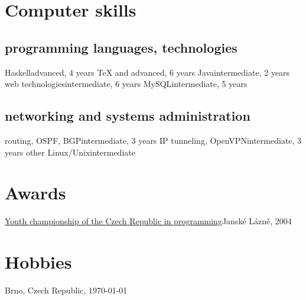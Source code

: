 \documentclass[11pt,a4paper]{moderncv}
\begin{document}
\section{Computer skills}
\subsection{programming languages, technologies}
    {Haskell}{advanced, 4 years}		%
    {\TeX{} and \LaTeXe{}}{advanced, 6 years}	%
    {Java}{intermediate, 2 years}		%
    {web technologies}{intermediate, 6 years}	%
    {MySQL}{intermediate, 5 years}		%
%
\subsection{networking and systems administration}
    {routing, OSPF, BGP}{intermediate, 3 years}		%
    {IP tunneling, OpenVPN}{intermediate, 3 years}	%
    {other Linux/Unix}{intermediate}

\section{Awards}
    {\href{http://www.stv.cz/pgm_cr/mcr2004vm.html}{Youth championship of the
    Czech Republic in programming}}{Janské Lázně, 2004}{}{}

\section{Hobbies}
\renewcommand{\listitemsymbol}{\Neutral}

\renewcommand{\refname}{Publications, talks}
\makeatletter
\def\mybiblabel#1(#2){\hskip 0pt plus 1filll\relax #2}
\def\@biblabel#1{\mybiblabel #1}
\makeatother
\nocite{*}



\vfill
Brno, Czech Republic, \today
\end{document}
